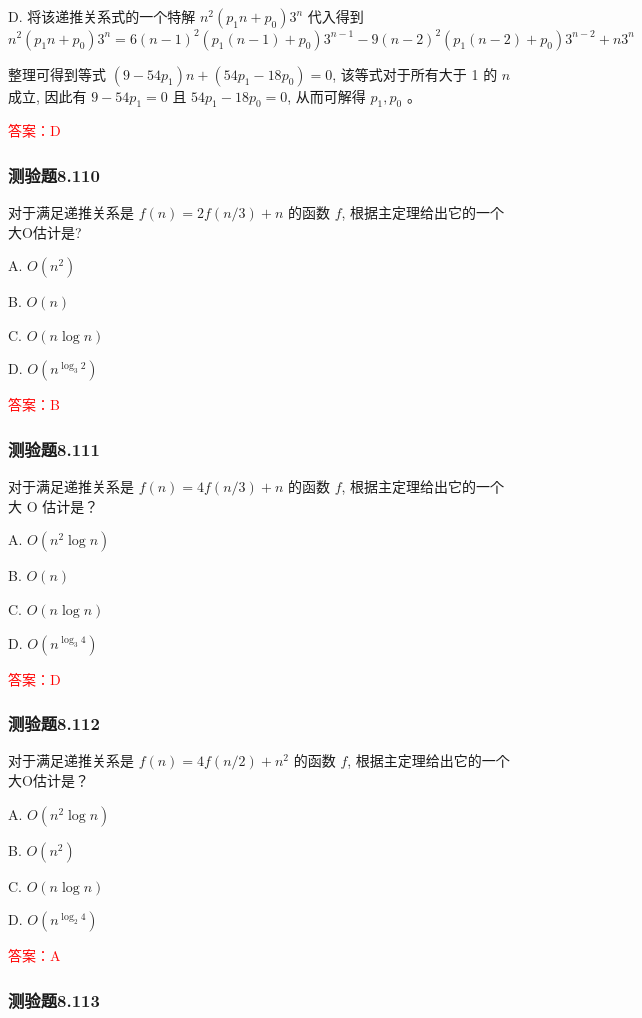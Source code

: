 \documentclass[UTF8, heading=true]{ctexart}
\begin{document}
D. 将该递推关系式的一个特解 $n^2\left(p_1 n+p_0\right) 3^n$ 代入得到
$$
n^2\left(p_1 n+p_0\right) 3^n=6(n-1)^2\left(p_1(n-1)+p_0\right) 3^{n-1}-9(n-2)^2\left(p_1(n-2)+p_0\right) 3^{n-2}+n 3^n
$$

整理可得到等式 $\left(9-54 p_1\right) n+\left(54 p_1-18 p_0\right)=0$, 该等式对于所有大于 1 的 $n$ 成立, 因此有 $9-54 p_1=0$ 且 $54 p_1-18 p_0=0$, 从而可解得 $p_1, p_0$ 。


\textcolor{red}{答案：D}

\subsubsection{测验题8.110}

对于满足递推关系是 $f(n)=2 f(n / 3)+n$ 的函数 $f$, 根据主定理给出它的一个大O估计是?

A. $O\left(n^2\right)$

B. $O(n)$

C. $O(n \log n)$

D. $O\left(n^{\log _3 2}\right)$

\textcolor{red}{答案：B}

\subsubsection{测验题8.111}

对于满足递推关系是 $f(n)=4 f(n / 3)+n$ 的函数 $f$, 根据主定理给出它的一个大 O 估计是？

A. $O\left(n^2 \log n\right)$

B. $O(n)$

C. $O(n \log n)$

D. $O\left(n^{\log _3 4}\right)$

\textcolor{red}{答案：D}

\subsubsection{测验题8.112}

对于满足递推关系是 $f(n)=4 f(n / 2)+n^2$ 的函数 $f$, 根据主定理给出它的一个大O估计是？

A. $O\left(n^2 \log n\right)$

B. $O\left(n^2\right)$

C. $O(n \log n)$

D. $O\left(n^{\log _2 4}\right)$

\textcolor{red}{答案：A}

\subsubsection{测验题8.113}
\end{document}

